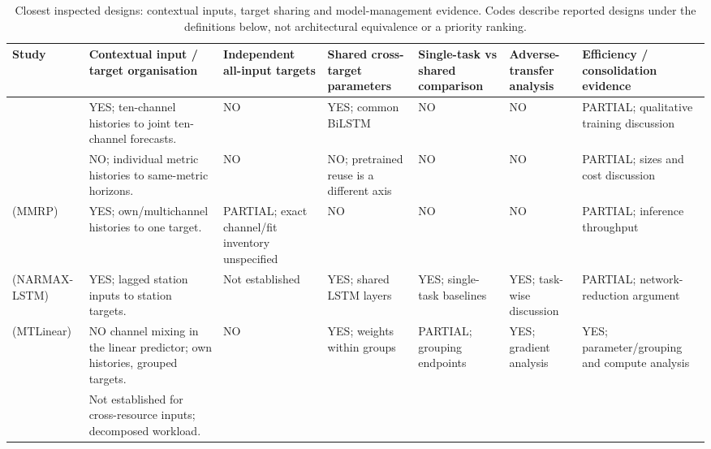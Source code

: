 \begin{table}[t]
  \caption{Closest inspected designs: contextual inputs, target sharing and
  model-management evidence. Codes describe reported designs under the
  definitions below, not architectural equivalence or a priority ranking.}
  \label{tab:related-work-comparison}
  \centering
  \small
  \setlength{\tabcolsep}{3pt}
  \begin{tabular}{@{}
    >{\raggedright\arraybackslash}p{}
    >{\raggedright\arraybackslash}p{}
    *{2}{>{\raggedright\arraybackslash}p{}}
    *{2}{>{\raggedright\arraybackslash}p{}}
    >{\raggedright\arraybackslash}p{}@{}}
    \toprule
    Study & Contextual input / target organisation
      & Independent all-input targets & Shared cross-target parameters
      & Single-task vs shared comparison & Adverse-transfer analysis
      & Efficiency / consolidation evidence \\
    \midrule
    \citet{Ullah2023CloudBiLSTM}
      & YES; ten-channel histories to joint ten-channel forecasts.
      & NO & YES; common BiLSTM & NO & NO
      & PARTIAL; qualitative training discussion \\
    \addlinespace
    \citet{DiMenna2026RuntimeForecasting}
      & NO; individual metric histories to same-metric horizons.
      & NO & NO; pretrained reuse is a different axis & NO & NO
      & PARTIAL; sizes and cost discussion \\
    \addlinespace
    \citet{Tripathi2025MMRP} (MMRP)
      & YES; own/multichannel histories to one target.
      & PARTIAL; exact channel/fit inventory unspecified
      & NO & NO & NO
      & PARTIAL; inference throughput \\
    \addlinespace
    \citet{Nikentari2022NARMAXLSTM} (NARMAX-LSTM)
      & YES; lagged station inputs to station targets.
      & Not established & YES; shared LSTM layers
      & YES; single-task baselines & YES; task-wise discussion
      & PARTIAL; network-reduction argument \\
    \addlinespace
    \citet{Nochumsohn2025MTLinear} (MTLinear)
      & NO channel mixing in the linear predictor; own histories, grouped targets.
      & NO & YES; weights within groups
      & PARTIAL; grouping endpoints & YES; gradient analysis
      & YES; parameter/grouping and compute analysis \\
    \addlinespace
    \citet{Bi2019CloudMultitask}
      & Not established for cross-resource inputs; decomposed workload.

\end{tabular}
\end{table}

